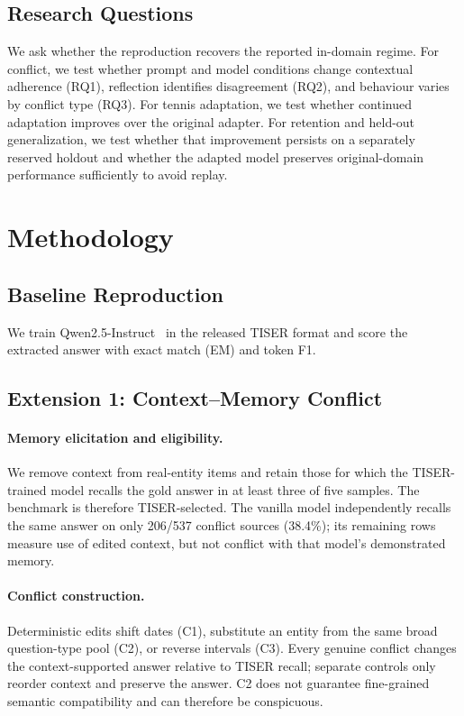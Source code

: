 \documentclass[conference]{IEEEtran}
\begin{document}
\subsection{Research Questions}

We ask whether the reproduction recovers the reported in-domain regime. For conflict, we test whether prompt and model conditions change contextual adherence (RQ1), reflection identifies disagreement (RQ2), and behaviour varies by conflict type (RQ3). For tennis adaptation, we test whether continued adaptation improves over the original adapter. For retention and held-out generalization, we test whether that improvement persists on a separately reserved holdout and whether the adapted model preserves original-domain performance sufficiently to avoid replay.

\section{Methodology}
\label{sec:methodology}

\subsection{Baseline Reproduction}

We train Qwen2.5-Instruct~\cite{qwen2024qwen25} in the released TISER format and score the extracted answer with exact match (EM) and token F1.

\subsection{Extension 1: Context--Memory Conflict}

\paragraph{Memory elicitation and eligibility.}
We remove context from real-entity items and retain those for which the TISER-trained model recalls the gold answer in at least three of five samples. The benchmark is therefore TISER-selected. The vanilla model independently recalls the same answer on only 206/537 conflict sources (38.4\%); its remaining rows measure use of edited context, but not conflict with that model's demonstrated memory.

\paragraph{Conflict construction.}
Deterministic edits shift dates (C1), substitute an entity from the same broad question-type pool (C2), or reverse intervals (C3). Every genuine conflict changes the context-supported answer relative to TISER recall; separate controls only reorder context and preserve the answer. C2 does not guarantee fine-grained semantic compatibility and can therefore be conspicuous.
\end{document}

